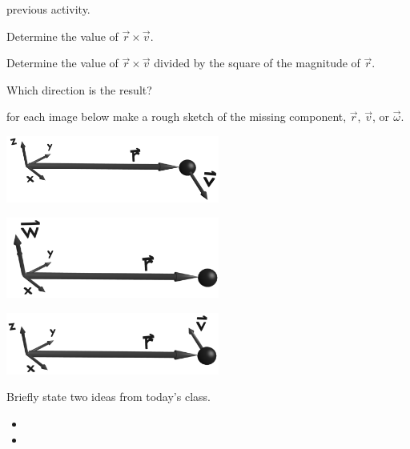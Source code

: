 \begin{problem}
\begin{subproblem}
    previous activity.
    \vfill
  \item Determine the value of $\vec{r}\times\vec{v}$.
    \vfill
  \item Determine the value of $\vec{r}\times\vec{v}$ divided by the
    square of the magnitude of $\vec{r}$.
    \vfill
  \item Which direction is the result?
    \vfill
  \end{subproblem}
\clearpage
\item for each image below make a rough sketch of the missing
  component, $\vec{r}$, $\vec{v}$, or $\vec{\omega}$.
  \begin{subproblem}
  \item \includegraphics[width=7cm]{blender/week12/negativeZOmega}
  \item \includegraphics[width=7cm]{blender/week12/findOmega}
  \item \includegraphics[width=7cm]{blender/week12/positiveZOmega}
  \end{subproblem}
\end{problem}

\postClass

\begin{problem}
\item Briefly state two ideas from today's class.
  \begin{itemize}
  \item 
  \item 
  \end{itemize}
\item 
  \begin{subproblem}
    \item
  \end{subproblem}
\end{problem}


